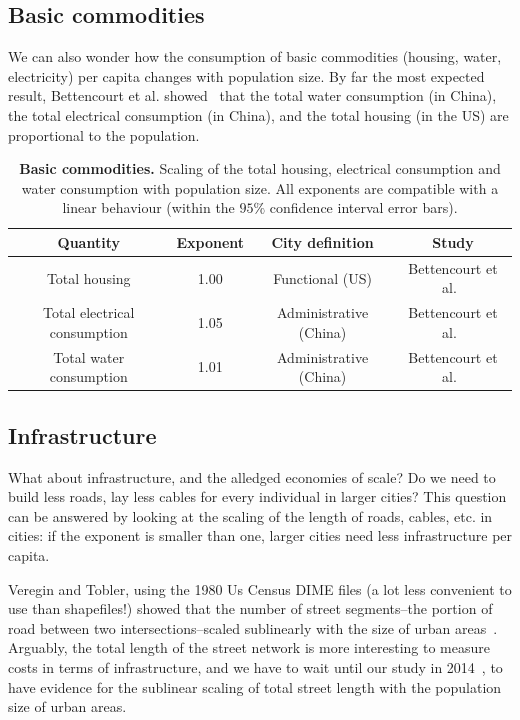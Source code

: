 \subsection{Basic commodities}
\label{sub:basic_commodities}

We can also wonder how the consumption of basic commodities (housing, water,
electricity) per capita changes with population size. By far the most expected
result, Bettencourt et al. showed~\cite{Bettencourt:2007} that the total water
consumption (in China), the total electrical consumption (in China),  and the
total housing (in the US) are proportional to the population.\\

\begin{table}[!h]
    \centering
\begin{tabular}{|cccc|}
\hline
Quantity & Exponent & City definition & Study\\
\hline
Total housing & 1.00 & Functional (US) & Bettencourt et al.~\cite{Bettencourt:2007}\\
Total electrical consumption & 1.05 & Administrative (China) & Bettencourt et al.~\cite{Bettencourt:2007}\\
Total water consumption & 1.01 & Administrative (China) & Bettencourt et al.~\cite{Bettencourt:2007}\\
\hline
\end{tabular}
\caption{{\bf Basic commodities. } Scaling of the total housing, electrical
    consumption and water consumption with population size. All exponents are
    compatible with a linear behaviour (within the $95\%$ confidence interval
    error bars).
}
\end{table}



\subsection{Infrastructure}
\label{sub:infrastructure}

What about infrastructure, and the alledged economies of scale? Do we need to build less
roads, lay less cables for every individual in larger cities? This question can
be answered by looking at the scaling of the length of roads, cables, etc. in
cities: if the exponent is smaller than one, larger cities need less
infrastructure per capita.

Veregin and Tobler, using the 1980 Us Census DIME files (a lot less convenient
to use than shapefiles!) showed that the number of street segments--the portion
of road between two intersections--scaled sublinearly with the size of urban
areas~\cite{Veregin:1997}. Arguably, the total length of the street network is
more interesting to measure costs in terms of infrastructure, and we have to
wait until our study in 2014~\cite{Louf:2014_scaling}, to
have evidence for the sublinear scaling of total street length with the
population size of urban areas. 


